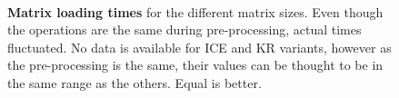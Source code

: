
\begin{figure}[!htbp]
    \begin{centering}
         \\
        \caption[Matrix loading times]
        {\textbf{Matrix loading times} for the different matrix sizes. Even though
        the operations are the same during pre-processing, actual times fluctuated.
        No data is available for ICE and KR variants, however as the pre-processing
        is the same, their values can be thought to be in the same range as the
        others. Equal is better.}
    \label{fig:loadtimes}
    \end{centering}
\end{figure}


